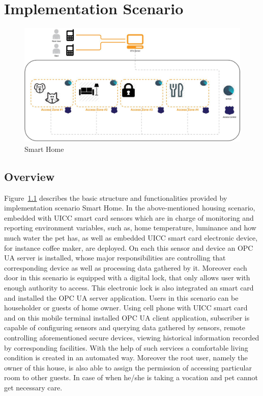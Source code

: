 \chapter{Implementation Scenario}
 \begin{figure}[!htbp]
	\centering
	\includegraphics[width=1.2\textwidth]{homeoverview.jpg}
		\caption{Smart Home}
	\label{fig:SmartHome}
\end{figure}

\section{Overview}
Figure~\ref{fig:SmartHome} describes the basic structure and functionalities provided by implementation scenario Smart Home.
In the above-mentioned housing scenario, embedded with UICC smart card sensors which are in charge of monitoring and reporting environment variables, such as, home temperature, luminance and how much water the pet has, as well as embedded UICC smart card electronic device, for instance coffee maker, are deployed. On each this sensor and device an OPC UA server is installed, whose major responsibilities are controlling that corresponding device as well as processing data gathered by it.  Moreover each door in this scenario is equipped with a digital lock, that only allows user with enough authority to access. This electronic lock is also integrated an smart card and installed the OPC UA server application. Users in this scenario can be householder or guests of home owner. Using cell phone with UICC smart card and on this mobile terminal installed OPC UA client application, subscriber is capable of configuring sensors and querying data gathered by sensors, remote controlling aforementioned secure devices, viewing historical information recorded by corresponding facilities. With the help of such services a comfortable living condition is created in an automated way.  Moreover the root user, namely the owner of this house, is also able to assign the permission of accessing particular room to other guests. In case of when he/she is taking a vocation and pet cannot get necessary care.


